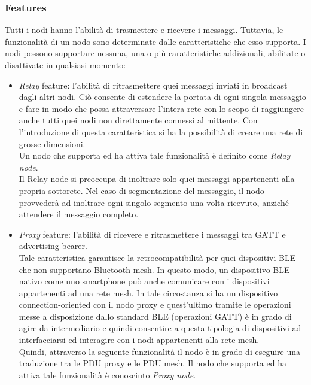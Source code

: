 \subsubsection{Features}
\label{subsub:features}
Tutti i nodi hanno l'abilità di trasmettere e ricevere i messaggi. Tuttavia, le funzionalità di un nodo sono determinate dalle caratteristiche che esso supporta. I nodi possono supportare nessuna, una o più caratteristiche addizionali, abilitate o disattivate in qualsiasi momento:
\begin{itemize}
    \item \textit{Relay} feature: l'abilità di ritrasmettere quei messaggi inviati in broadcast dagli altri nodi. 
    Ciò consente di estendere la portata di ogni singola messaggio e fare in modo che possa attraversare l'intera rete con lo scopo di raggiungere anche tutti quei nodi non direttamente connessi al mittente. Con l'introduzione di questa caratteristica si ha la possibilità di creare una rete di grosse dimensioni.\\ %
    Un nodo che supporta ed ha attiva tale funzionalità è definito come \textit{Relay node}.\\
    Il Relay node si preoccupa di inoltrare solo quei messaggi appartenenti alla propria sottorete. Nel caso di segmentazione del messaggio, il nodo provvederà ad inoltrare ogni singolo segmento una volta ricevuto, anziché attendere il messaggio completo.
    
    \item \textit{Proxy} feature: l'abilità di ricevere e ritrasmettere i messaggi tra GATT e advertising bearer. \\
    Tale caratteristica garantisce la retrocompatibilità per quei dispositivi BLE che non supportano Bluetooth mesh. In questo modo, un dispositivo BLE nativo come uno smartphone può anche comunicare con i dispositivi appartenenti ad una rete mesh. 
    In tale circostanza si ha un dispositivo connection-oriented con il nodo proxy e quest'ultimo tramite le operazioni messe a disposizione dallo standard BLE (operazioni GATT) è in grado di agire da intermediario e quindi consentire a questa tipologia di dispositivi ad interfacciarsi ed interagire con i nodi appartenenti alla rete mesh.\\
    Quindi, attraverso la seguente funzionalità il nodo è in grado di eseguire una traduzione tra le PDU proxy e le PDU mesh. Il nodo che supporta ed ha attiva tale funzionalità è conosciuto \textit{Proxy node}.
    

\end{itemize}
